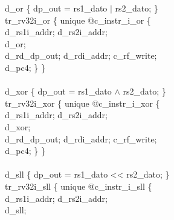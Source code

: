 {%
\indent d\_or \{ dp\_out = rs1\_dato $\vert$ rs2\_dato; \}\\%
\indent tr\_rv32i\_or \{ unique @c\_instr\_i\_or \{ \\%
\indent \hspace{\parindent} d\_rs1i\_addr; d\_rs2i\_addr; \\%
\indent \hspace{\parindent} d\_or; \\%
\indent \hspace{\parindent} d\_rd\_dp\_out; d\_rdi\_addr; c\_rf\_write;  \\%
\indent \hspace{\parindent} d\_pc4; \} \} \\%
\\
\indent d\_xor \{ dp\_out = rs1\_dato $\wedge$ rs2\_dato; \}\\%
\indent tr\_rv32i\_xor \{ unique @c\_instr\_i\_xor \{ \\%
\indent \hspace{\parindent} d\_rs1i\_addr; d\_rs2i\_addr; \\%
\indent \hspace{\parindent} d\_xor; \\%
\indent \hspace{\parindent} d\_rd\_dp\_out; d\_rdi\_addr; c\_rf\_write;  \\%
\indent \hspace{\parindent} d\_pc4; \} \} \\%
\\
\indent d\_sll \{ dp\_out = rs1\_dato << rs2\_dato; \}\\%
\indent tr\_rv32i\_sll \{ unique @c\_instr\_i\_sll \{ \\%
\indent \hspace{\parindent} d\_rs1i\_addr; d\_rs2i\_addr; \\%
\indent \hspace{\parindent} d\_sll; \\%
}
